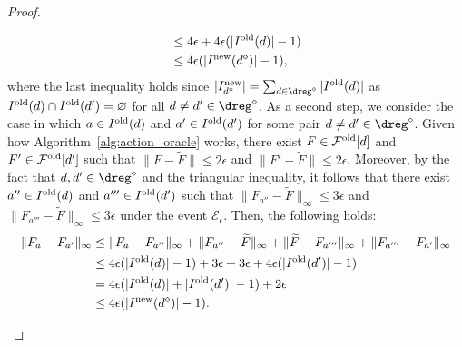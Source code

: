 \begin{proof}
\begin{enumerate}
\begin{enumerate}
\begin{align*}
				&     \le 4 \epsilon +  4 \epsilon(|I^{\textnormal{old}}({d}) | -1 ) \\
				&   \le 4 \epsilon(|I^{\textnormal{new}}(d^\diamond)| -1 ),
			\end{align*}
			where the last inequality holds since $|I^{\textnormal{new}}_{d^\diamond}| = \sum_{d \in \dreg^\diamond} |I^{\textnormal{old}}(d)|$ as $I^{\textnormal{old}}(d) \cap I^{\textnormal{old}}(d')=\varnothing$ for all $d \neq d' \in \dreg^\diamond$. 
			As a second step, we consider the case in which $a \in I^{\textnormal{old}}(d)$ and $a' \in I^{\textnormal{old}}(d')$ for some pair $d \neq d' \in \dreg^\diamond$.
			Given how Algorithm~\ref{alg:action_oracle} works, there exist $F \in \mathcal{F}^{\textnormal{old}}[d]$ and $F' \in \mathcal{F}^{\textnormal{old}}[d']$ such that $\| F -\widetilde F \| \le 2 \epsilon$ and $\| F' -\widetilde F \| \le 2 \epsilon$.
			Moreover, by the fact that $d, d' \in \dreg^\diamond$ and the triangular inequality, it follows that there exist $a'' \in I^{\textnormal{old}}(d)$ and $a''' \in I^{\textnormal{old}}(d')$ such that $\|F_{a''} -\widetilde F \|_{\infty} \le 3 \epsilon$ and $\| F_{a'''} - \widetilde F \|_{\infty} \le 3 \epsilon$ under the event $\mathcal{E}_\epsilon$.
			Then, the following holds:
			\begin{align*}
				\| F_{a}- F_{a'}\|_{\infty} & \le\| F_{a}- F_{a''}  \|_{\infty} +\| F_{a''} -\widetilde F \|_{\infty} + \| \widetilde F - F_{a'''}  \|_{\infty}  + \|  F_{a'''} - F_{a'}  \|_{\infty}\\
				&   \le 4 \epsilon(|I^{\textnormal{old}}({d}) | -1 ) + 3\epsilon +  3 \epsilon + 4 \epsilon(|I^{\textnormal{old}}({d'}) | -1 )\\
				&   = 4 \epsilon(|I^{\textnormal{old}}({d}) | +  | I^{\textnormal{old}}(d') | -1 ) +2\epsilon \\
				& \le 4 \epsilon(|I^{\textnormal{new}}({d^\diamond}) | -1 ).
			\end{align*}
		\end{enumerate}
	\end{enumerate}



\end{proof}
